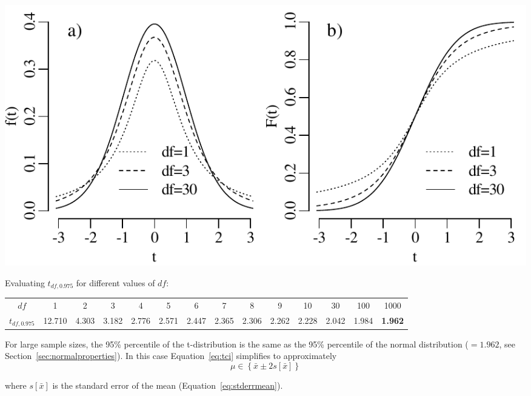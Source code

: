 \noindent\begin{minipage}[t][][b]{.6\textwidth}
  \includegraphics[]{../figures/tdof.pdf}\medskip
\end{minipage}
\begin{minipage}[t][][t]{.4\textwidth}
  \label{fig:tdof}
\end{minipage}

Evaluating $t_{df,0.975}$ for different values of $df$:

\begin{center}
  \begin{tabular}{c|c@{\gap}c@{\gap}c@{\gap}c@{\gap}c@{\gap}c
      @{\gap}c@{\gap}c@{\gap}c@{\gap}c@{\gap}c@{\gap}c@{\gap}c}
    $df$ & 1 & 2 & 3 & 4 & 5 & 6 & 7 & 8 & 9 & 10 & 30 & 100 & 1000 \\
    $t_{df,0.975}$ &  12.710 & 4.303 & 3.182 & 2.776 & 2.571 &
    2.447 & 2.365 & 2.306 & 2.262 & 2.228 & 2.042 & 1.984 & \textbf{1.962}
  \end{tabular}
\end{center}

For large sample sizes, the 95\% percentile of the t-distribution is
the same as the 95\% percentile of the normal distribution ($=1.962$,
see Section~\ref{sec:normalproperties}). In this case
Equation~\ref{eq:tci} simplifies to approximately
\[
\mu \in \left\{ \bar{x} \pm 2 s[\bar{x}] \right\}
\]

\noindent where $s[\bar{x}]$ is the standard error of the mean
(Equation~\ref{eq:stderrmean}).

